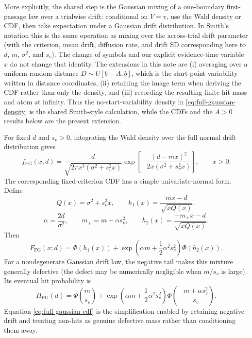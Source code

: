 \documentclass[12pt]{article}
\newcommand{\PhiN}{\Phi}
\begin{document}
More explicitly, the shared step is the Gaussian mixing of a one-boundary first-passage law over a trialwise drift: conditional on $V=v$, use the Wald density or CDF, then take expectation under a Gaussian drift distribution. In Smith's notation this is the same operation as mixing over the across-trial drift parameter (with the criterion, mean drift, diffusion rate, and drift SD corresponding here to $d$, $m$, $\sigma^2$, and $s_v$). The change of symbols and our explicit evidence-time variable $x$ do not change that identity. The extensions in this note are (i) averaging over a uniform random distance $D\sim U[b-A,b]$, which is the start-point variability written in distance coordinates, (ii) retaining the image term when deriving the CDF rather than only the density, and (iii) recording the resulting finite hit mass and atom at infinity. Thus the no-start-variability density in
\eqref{eq:full-gaussian-density} is the shared Smith-style calculation, while
the CDFs and the $A>0$ results below are the present extension.

For fixed $d$ and $s_v>0$, integrating the Wald density over the full normal drift distribution gives
\begin{equation}
  f_{\mathrm{FG}}(x;d)=
  \frac{d}{\sqrt{2\pi x^3(\sigma^2+s_v^2x)}}
  \exp\!\left[-\frac{(d-mx)^2}{2x(\sigma^2+s_v^2x)}\right],
  \qquad x>0.
  \label{eq:full-gaussian-density}
\end{equation}
The corresponding fixed-criterion CDF has a simple univariate-normal form. Define
\begin{equation}
  Q(x)=\sigma^2+s_v^2x,
  \qquad
  h_1(x)=\frac{mx-d}{\sqrt{xQ(x)}},
\end{equation}
\begin{equation}
  \alpha=\frac{2d}{\sigma^2},
  \qquad
  m_+=m+\alpha s_v^2,
  \qquad
  h_2(x)=\frac{-m_+x-d}{\sqrt{xQ(x)}}.
\end{equation}
Then
\begin{equation}
  F_{\mathrm{FG}}(x;d)=
  \PhiN\!\left(h_1(x)\right)
  +\exp\!\left(\alpha m+\frac{1}{2}\alpha^2s_v^2\right)
  \PhiN\!\left(h_2(x)\right).
  \label{eq:full-gaussian-cdf}
\end{equation}
For a nondegenerate Gaussian drift law, the negative tail makes this mixture generally defective (the defect may be numerically negligible when $m/s_v$ is large). Its eventual hit probability is
\begin{equation}
  H_{\mathrm{FG}}(d)=
  \PhiN\!\left(\frac{m}{s_v}\right)
  +\exp\!\left(\alpha m+\frac{1}{2}\alpha^2s_v^2\right)
  \PhiN\!\left(-\frac{m+\alpha s_v^2}{s_v}\right).
  \label{eq:full-gaussian-hit-mass}
\end{equation}
Equation \eqref{eq:full-gaussian-cdf} is the simplification enabled by retaining negative drift and treating non-hits as genuine defective mass rather than conditioning them away.
\end{document}
